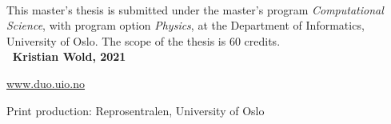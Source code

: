 \textit{} 
\\ [100 pt]
This master's thesis is submitted under the master's program \textit{Computational Science}, with program option \textit{Physics}, at the Department of Informatics, University of Oslo. The scope of the thesis is 60 credits.
\\ [350 pt]
\textbf{\faCopyright \, Kristian Wold, 2021}

\href{https://www.duo.uio.no/}{www.duo.uio.no}

Print production: Reprosentralen, University of Oslo